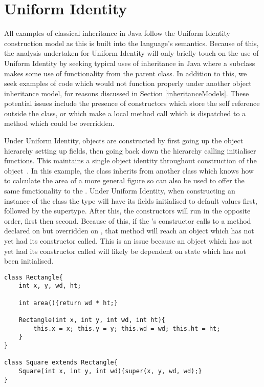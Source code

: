\section{Uniform Identity}
\label{sec:uniformIdentity}
All examples of classical inheritance in Java follow the Uniform Identity construction model as this is built into the language's semantics. Because of this, the analysis undertaken for Uniform Identity will only briefly touch on the use of Uniform Identity by seeking typical uses of inheritance in Java where a subclass makes some use of functionality from the parent class. In addition to this, we seek examples of code which would not function properly under another object inheritance model, for reasons discussed in Section \ref{inheritanceModels}. These potential issues include the presence of constructors which store the self reference outside the class, or which make a local method call which is dispatched to a method which could be overridden.
\newline

Under Uniform Identity, objects are constructed by first going up the object hierarchy setting up fields, then going back down the hierarchy calling initialiser functions. This maintains a single object identity throughout construction of the object~\cite{InheritanceWithoutClasses}. In this example, the  class inherits from another class which knows how to calculate the area of a more general figure so can also be used to offer the same functionality to the . Under Uniform Identity, when constructing an instance of the  class the  type will have its fields initialised to default values first, followed by the  supertype. After this, the constructors will run in the opposite order,  first then  second. Because of this, if the 's constructor calls to a method declared on  but overridden on , that method will reach an object which has not yet had its constructor called. This is an issue because an object which has not yet had its constructor called will likely be dependent on state which has not been initialised.
\begin{lstlisting}
class Rectangle{
	int x, y, wd, ht;

	int area(){return wd * ht;}

	Rectangle(int x, int y, int wd, int ht){
		this.x = x; this.y = y; this.wd = wd; this.ht = ht;
	}
}

class Square extends Rectangle{
	Square(int x, int y, int wd){super(x, y, wd, wd);}
}
\end{lstlisting}

